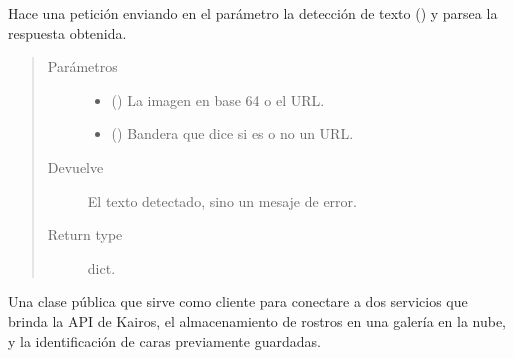 \begin{fulllineitems}
\begin{fulllineitems}
\begin{fulllineitems}
\label{\detokenize{chapter_two/desc_cloudnao:app.tpa_client_libraries.google_cloud_vision.GoogleCloudVision.text_annotations_description}}
Hace una petición enviando en el parámetro  la detección
de texto ()
y parsea la respuesta obtenida.
\begin{quote}\begin{description}
\item[{Parámetros}] \leavevmode\begin{itemize}
\item {} 
 () \textendash{} La imagen en base 64 o el URL.

\item {} 
 () \textendash{} Bandera que dice si es o no un URL.

\end{itemize}

\item[{Devuelve}] \leavevmode
El texto detectado, sino un mesaje de error.

\item[{Return type}] \leavevmode
dict.

\end{description}\end{quote}

\end{fulllineitems}


\end{fulllineitems}

\label{\detokenize{chapter_two/desc_cloudnao:module-app.tpa_client_libraries.kairos_client}}\label{\detokenize{chapter_two/desc_cloudnao:module-kairos}}

\begin{fulllineitems}
\label{\detokenize{chapter_two/desc_cloudnao:app.tpa_client_libraries.kairos_client.Kairos}}
Una clase pública que sirve como cliente para conectare a dos servicios
que brinda la API de Kairos, el almacenamiento de rostros en una galería en la nube, y
la identificación de caras previamente guardadas.


\end{fulllineitems}
\end{fulllineitems}
